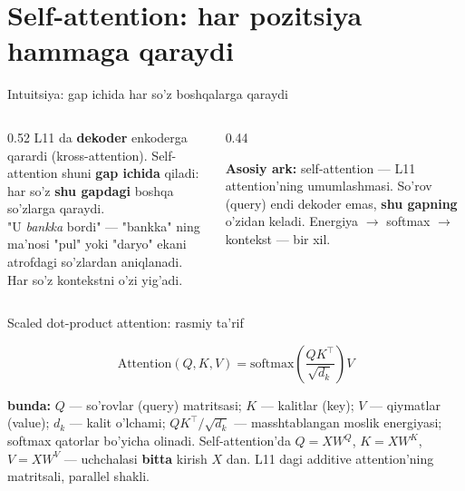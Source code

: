 \documentclass[aspectratio=169,11pt]{beamer}
\newcommand{\bunda}[1]{{\small\textbf{bunda:}\; #1}}
\begin{document}
\section[Self-Attention]{Self-attention: har pozitsiya hammaga qaraydi}

\begin{frame}{Intuitsiya: gap ichida har so'z boshqalarga qaraydi}
  \begin{columns}[T]
    \begin{column}{0.52\textwidth}
      \small
      L11 da \textbf{dekoder} enkoderga qarardi (kross-attention). Self-attention
      shuni \textbf{gap ichida} qiladi: har so'z \textbf{shu gapdagi} boshqa
      so'zlarga qaraydi.\\[5pt]
      "U \textit{bankka} bordi" --- "bankka" ning ma'nosi "pul" yoki "daryo"
      ekani atrofdagi so'zlardan aniqlanadi. Har so'z kontekstni o'zi yig'adi.
    \end{column}
    \begin{column}{0.44\textwidth}
      \begin{tcolorbox}[okbox,top=2pt,bottom=2pt]
        \footnotesize
        \textbf{Asosiy ark:} self-attention --- L11 attention'ning
        umumlashmasi. So'rov (query) endi dekoder emas, \textbf{shu gapning}
        o'zidan keladi. Energiya $\to$ softmax $\to$ kontekst --- bir xil.
      \end{tcolorbox}
    \end{column}
  \end{columns}
\end{frame}

\begin{frame}{Scaled dot-product attention: rasmiy ta'rif}
  \begin{tcolorbox}[defbox,title={Ta'rif: Attention(Q, K, V)}]
    \vspace{-0.4em}
    $$ \mathrm{Attention}(Q,K,V) = \mathrm{softmax}\!\left(\frac{Q K^{\top}}{\sqrt{d_k}}\right) V $$
  \end{tcolorbox}
  \vspace{2pt}
  \bunda{$Q$ --- so'rovlar (query) matritsasi; $K$ --- kalitlar (key); $V$ ---
  qiymatlar (value); $d_k$ --- kalit o'lchami; $Q K^{\top}/\sqrt{d_k}$ ---
  masshtablangan moslik energiyasi; softmax qatorlar bo'yicha olinadi.}
  \vspace{4pt}
  \footnotesize Self-attention'da $Q=XW^Q$, $K=XW^K$, $V=XW^V$ --- uchchalasi
  \textbf{bitta} kirish $X$ dan. L11 dagi additive attention'ning matritsali,
  parallel shakli.
\end{frame}
\end{document}
